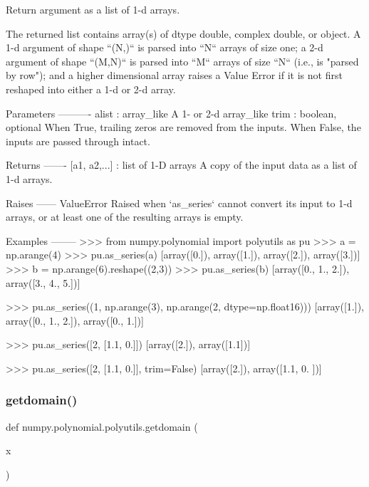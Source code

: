 \begin{DoxyVerb}Return argument as a list of 1-d arrays.

The returned list contains array(s) of dtype double, complex double, or
object.  A 1-d argument of shape ``(N,)`` is parsed into ``N`` arrays of
size one; a 2-d argument of shape ``(M,N)`` is parsed into ``M`` arrays
of size ``N`` (i.e., is "parsed by row"); and a higher dimensional array
raises a Value Error if it is not first reshaped into either a 1-d or 2-d
array.

Parameters
----------
alist : array_like
    A 1- or 2-d array_like
trim : boolean, optional
    When True, trailing zeros are removed from the inputs.
    When False, the inputs are passed through intact.

Returns
-------
[a1, a2,...] : list of 1-D arrays
    A copy of the input data as a list of 1-d arrays.

Raises
------
ValueError
    Raised when `as_series` cannot convert its input to 1-d arrays, or at
    least one of the resulting arrays is empty.

Examples
--------
>>> from numpy.polynomial import polyutils as pu
>>> a = np.arange(4)
>>> pu.as_series(a)
[array([0.]), array([1.]), array([2.]), array([3.])]
>>> b = np.arange(6).reshape((2,3))
>>> pu.as_series(b)
[array([0., 1., 2.]), array([3., 4., 5.])]

>>> pu.as_series((1, np.arange(3), np.arange(2, dtype=np.float16)))
[array([1.]), array([0., 1., 2.]), array([0., 1.])]

>>> pu.as_series([2, [1.1, 0.]])
[array([2.]), array([1.1])]

>>> pu.as_series([2, [1.1, 0.]], trim=False)
[array([2.]), array([1.1, 0. ])]\end{DoxyVerb}
 \mbox{\label{namespacenumpy_1_1polynomial_1_1polyutils_a4a9585936f3fb9a6e0c297f9634984bf}} 
\subsubsection{\texorpdfstring{getdomain()}{getdomain()}}
{\footnotesize\ttfamily def numpy.\+polynomial.\+polyutils.\+getdomain (\begin{DoxyParamCaption}\item[{}]{x }\end{DoxyParamCaption})}


